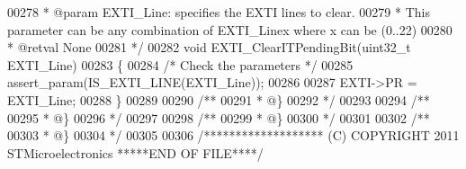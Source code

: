 \begin{DoxyCode}
00278 \textcolor{comment}{  * @param  EXTI\_Line: specifies the EXTI lines to clear.}
00279 \textcolor{comment}{  *          This parameter can be any combination of EXTI\_Linex where x can be (0..22)}
00280 \textcolor{comment}{  * @retval None}
00281 \textcolor{comment}{  */}
00282 \textcolor{keywordtype}{void} EXTI_ClearITPendingBit(uint32\_t EXTI\_Line)
00283 \{
00284   \textcolor{comment}{/* Check the parameters */}
00285   assert_param(IS\_EXTI\_LINE(EXTI\_Line));
00286 
00287   EXTI->PR = EXTI\_Line;
00288 \}
00289 
00290 \textcolor{comment}{/**}
00291 \textcolor{comment}{  * @\}}
00292 \textcolor{comment}{  */}
00293 
00294 \textcolor{comment}{/**}
00295 \textcolor{comment}{  * @\}}
00296 \textcolor{comment}{  */}
00297 
00298 \textcolor{comment}{/**}
00299 \textcolor{comment}{  * @\}}
00300 \textcolor{comment}{  */}
00301 
00302 \textcolor{comment}{/**}
00303 \textcolor{comment}{  * @\}}
00304 \textcolor{comment}{  */}
00305 
00306 \textcolor{comment}{/******************* (C) COPYRIGHT 2011 STMicroelectronics *****END OF FILE****/}
\end{DoxyCode}
